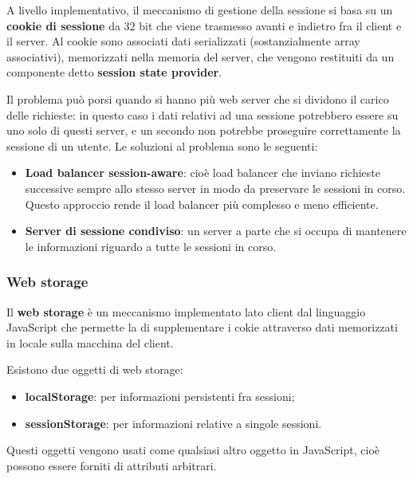 \documentclass[a4paper,11pt]{article}
\begin{document}
A livello implementativo, il meccanismo di gestione della sessione si basa su un \textbf{cookie di sessione} da 32 bit che viene trasmesso avanti e indietro fra il client e il server.
Al cookie sono associati dati serializzati (sostanzialmente array associativi), memorizzati nella memoria del server, che vengono restituiti da un componente detto \textbf{session state provider}.

Il problema può porsi quando si hanno più web server che si dividono il carico delle richieste: in questo caso i dati relativi ad una sessione potrebbero essere su uno solo di questi server, e un secondo non potrebbe proseguire correttamente la sessione di un utente.
Le soluzioni al problema sono le seguenti:
\begin{itemize}
	\item \textbf{Load balancer session-aware}: cioè load balancer che inviano richieste successive sempre allo stesso server in modo da preservare le sessioni in corso.
		Questo approccio rende il load balancer più complesso e meno efficiente.
	\item \textbf{Server di sessione condiviso}: un server a parte che si occupa di mantenere le informazioni riguardo a tutte le sessioni in corso.
\end{itemize}

\subsubsection{Web storage}
Il \textbf{web storage} è un meccanismo implementato lato client dal linguaggio JavaScript che permette la di supplementare i cokie attraverso dati memorizzati in locale sulla macchina del client.

Esistono due oggetti di web storage:
\begin{itemize}
	\item \textbf{localStorage}: per informazioni persistenti fra sessioni;
	\item \textbf{sessionStorage}: per informazioni relative a singole sessioni.
\end{itemize}

Questi oggetti vengono usati come qualsiasi altro oggetto in JavaScript, cioè possono essere forniti di attributi arbitrari.
\end{document}
